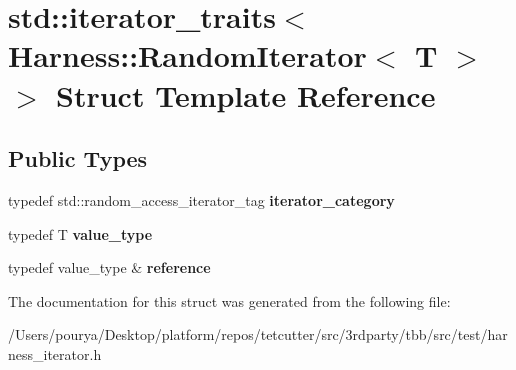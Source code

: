 \hypertarget{structstd_1_1iterator__traits_3_01Harness_1_1RandomIterator_3_01T_01_4_01_4}{}\section{std\+:\+:iterator\+\_\+traits$<$ Harness\+:\+:Random\+Iterator$<$ T $>$ $>$ Struct Template Reference}
\label{structstd_1_1iterator__traits_3_01Harness_1_1RandomIterator_3_01T_01_4_01_4}
\subsection*{Public Types}
\begin{DoxyCompactItemize}
\item 
\hypertarget{structstd_1_1iterator__traits_3_01Harness_1_1RandomIterator_3_01T_01_4_01_4_aec10cee4813d55a7fb0a221cc57ad826}{}typedef std\+::random\+\_\+access\+\_\+iterator\+\_\+tag {\bfseries iterator\+\_\+category}\label{structstd_1_1iterator__traits_3_01Harness_1_1RandomIterator_3_01T_01_4_01_4_aec10cee4813d55a7fb0a221cc57ad826}

\item 
\hypertarget{structstd_1_1iterator__traits_3_01Harness_1_1RandomIterator_3_01T_01_4_01_4_add02ed23dcd36d601cc54110323af46b}{}typedef T {\bfseries value\+\_\+type}\label{structstd_1_1iterator__traits_3_01Harness_1_1RandomIterator_3_01T_01_4_01_4_add02ed23dcd36d601cc54110323af46b}

\item 
\hypertarget{structstd_1_1iterator__traits_3_01Harness_1_1RandomIterator_3_01T_01_4_01_4_a63f68f1a7de4e7b6da40b4a6fac30133}{}typedef value\+\_\+type \& {\bfseries reference}\label{structstd_1_1iterator__traits_3_01Harness_1_1RandomIterator_3_01T_01_4_01_4_a63f68f1a7de4e7b6da40b4a6fac30133}

\end{DoxyCompactItemize}


The documentation for this struct was generated from the following file\+:\begin{DoxyCompactItemize}
\item 
/\+Users/pourya/\+Desktop/platform/repos/tetcutter/src/3rdparty/tbb/src/test/harness\+\_\+iterator.\+h\end{DoxyCompactItemize}
